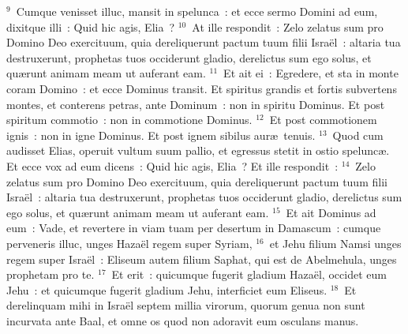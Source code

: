 ${}^{9}$~Cumque venisset illuc, mansit in spelunca~: et ecce sermo Domini ad eum, dixitque illi~: Quid hic agis, Elia~?
${}^{10}$~At ille respondit~: Zelo zelatus sum pro Domino Deo exercituum, quia dereliquerunt pactum tuum filii Isra\"el~: altaria tua destruxerunt, prophetas tuos occiderunt gladio, derelictus sum ego solus, et qu\ae runt animam meam ut auferant eam.
${}^{11}$~Et ait ei~: Egredere, et sta in monte coram Domino~: et ecce Dominus transit. Et spiritus grandis et fortis subvertens montes, et conterens petras, ante Dominum~: non in spiritu Dominus. Et post spiritum commotio~: non in commotione Dominus.
${}^{12}$~Et post commotionem ignis~: non in igne Dominus. Et post ignem sibilus aur\ae\ tenuis.
${}^{13}$~Quod cum audisset Elias, operuit vultum suum pallio, et egressus stetit in ostio spelunc\ae . Et ecce vox ad eum dicens~: Quid hic agis, Elia~? Et ille respondit~:
${}^{14}$~Zelo zelatus sum pro Domino Deo exercituum, quia dereliquerunt pactum tuum filii Isra\"el~: altaria tua destruxerunt, prophetas tuos occiderunt gladio, derelictus sum ego solus, et qu\ae runt animam meam ut auferant eam.
${}^{15}$~Et ait Dominus ad eum~: Vade, et revertere in viam tuam per desertum in Damascum~: cumque perveneris illuc, unges Haza\"el regem super Syriam,
${}^{16}$~et Jehu filium Namsi unges regem super Isra\"el~: Eliseum autem filium Saphat, qui est de Abelmehula, unges prophetam pro te.
${}^{17}$~Et erit~: quicumque fugerit gladium Haza\"el, occidet eum Jehu~: et quicumque fugerit gladium Jehu, interficiet eum Eliseus.
${}^{18}$~Et derelinquam mihi in Isra\"el septem millia virorum, quorum genua non sunt incurvata ante Baal, et omne os quod non adoravit eum osculans manus.


